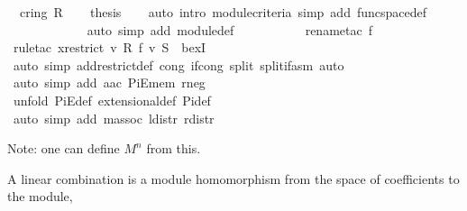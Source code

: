 \begin{isabellebody}
\ {}{\isacharcolon}\ {\isachardoublequoteopen}cring\ R{\isachardoublequoteclose}\isacommand{{\isachardot}{\isachardot}}\isamarkupfalse%
\isanewline
{}\isamarkupfalse%
\ {}\ \isamarkupfalse%
\ {\isacharquery}thesis\isanewline
\ \ \isamarkupfalse%
\ {\isacharparenleft}auto\ intro{\isacharbang}{\isacharcolon}\ module{\isacharunderscore}criteria\ simp\ add{\isacharcolon}\ func{\isacharunderscore}space{\isacharunderscore}def{\isacharparenright}\isanewline
\ \ \ \ \ \ \ \ \ \ \ \isamarkupfalse%
\ {\isacharparenleft}auto\ simp\ add{\isacharcolon}\ module{\isacharunderscore}def{\isacharparenright}\isanewline
\ \ \ \ \ \ \ \ \ \isamarkupfalse%
\ {\isacharparenleft}rename{\isacharunderscore}tac\ f{\isacharparenright}\isanewline
\ \ \ \ \ \ \ \ \ \isamarkupfalse%
\ {\isacharparenleft}rule{\isacharunderscore}tac\ x{\isacharequal}{\isachardoublequoteopen}restrict\ {\isacharparenleft}{\isasymlambda}v{\isacharprime}{\isachardot}\ {\isasymominus}\isactrlbsub R\isactrlesub \ {\isacharparenleft}f\ v{\isacharprime}{\isacharparenright}{\isacharparenright}\ S{\isachardoublequoteclose}\ \ bexI{\isacharparenright}\isanewline
\ \ \ \ \ \ \ \ \ \ \isamarkupfalse%
\ {\isacharparenleft}auto\ simp\ add{\isacharcolon}restrict{\isacharunderscore}def\ cong{\isacharcolon}\ if{\isacharunderscore}cong\ split{\isacharcolon}\ split{\isacharunderscore}if{\isacharunderscore}asm{\isacharcomma}\ auto{\isacharparenright}\isanewline
\ \ \ \ \ \ \ \ \ \isamarkupfalse%
\ {\isacharparenleft}auto\ simp\ add{\isacharcolon}\ a{\isacharunderscore}ac\ PiE{\isacharunderscore}mem{}\ r{\isacharunderscore}neg{\isacharparenright}\ \isanewline
\ \ \ \ \ \ \isamarkupfalse%
\ {\isacharparenleft}unfold\ PiE{\isacharunderscore}def\ extensional{\isacharunderscore}def\ Pi{\isacharunderscore}def{\isacharparenright}\isanewline
\ \ \ \ \ \ \isamarkupfalse%
\ {\isacharparenleft}auto\ simp\ add{\isacharcolon}\ m{\isacharunderscore}assoc\ l{\isacharunderscore}distr\ r{\isacharunderscore}distr{\isacharparenright}\isanewline
{}\isamarkupfalse%
%
\endisatagproof
{\isafoldproof}%
%
\isadelimproof
%
\endisadelimproof
%
\begin{isamarkuptext}%
Note: one can define $M^n$ from this.%
\end{isamarkuptext}%
\isamarkuptrue%
%
\begin{isamarkuptext}%
A linear combination is a module homomorphism from the space of coefficients to the module,

\end{isamarkuptext}
\end{isabellebody}
